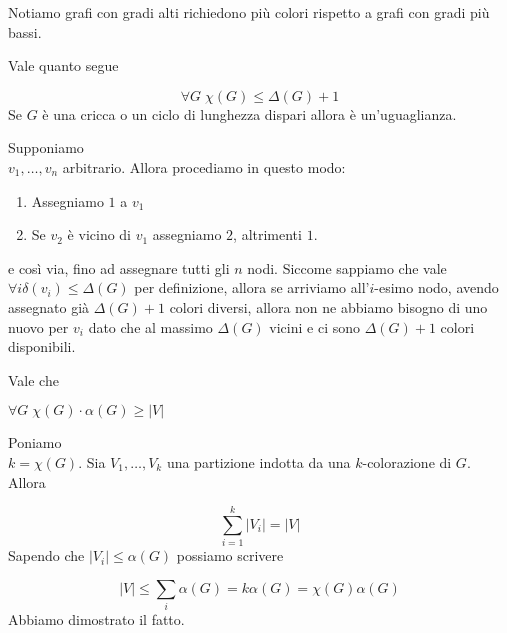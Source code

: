 \documentclass[12pt]{report}
\begin{document}
\noindent 
Notiamo grafi con gradi alti richiedono più colori rispetto a grafi con gradi più bassi. 

\begin{fatto} Vale quanto segue 

$$\forall G \; \chi(G) \leq \Delta(G) + 1$$
Se $G$ è una cricca o un ciclo di lunghezza dispari allora è un'uguaglianza.
\end{fatto}

\begin{dimo}
    Supponiamo \\ $v_1,\dots,v_n$ arbitrario. Allora procediamo in questo modo:

    \begin{enumerate}
        \item Assegniamo $1$ a $v_1$
        \item Se $v_2$ è vicino di $v_1$ assegniamo $2$, altrimenti $1$.
    \end{enumerate}
    e così via, fino ad assegnare tutti gli $n$ nodi. Siccome sappiamo che vale $\forall i \delta(v_i) \leq \Delta(G)$ per definizione, allora se arriviamo all'$i$-esimo nodo, avendo assegnato già $\Delta(G) + 1$ colori diversi, allora non ne abbiamo bisogno di uno nuovo per $v_i$ dato che al massimo $\Delta(G)$ vicini e ci sono $\Delta(G) + 1$ colori disponibili.
\end{dimo}

\begin{fatto}
    Vale che 

    $\forall G  \; \chi(G) \cdot \alpha(G) \geq |V|$
\end{fatto}

\begin{dimo}
    Poniamo \\ $k = \chi(G)$. Sia $V_1,\dots,V_k$ una partizione indotta da una $k$-colorazione di $G$. Allora

    $$\sum_{i = 1}^k |V_i|  = |V|$$
    Sapendo che $|V_i| \leq \alpha(G)$ possiamo scrivere

    $$|V| \leq \sum_i \alpha(G)  = k \alpha(G) = \chi(G) \alpha(G)$$ Abbiamo dimostrato il fatto.
\end{dimo}
\end{document}
